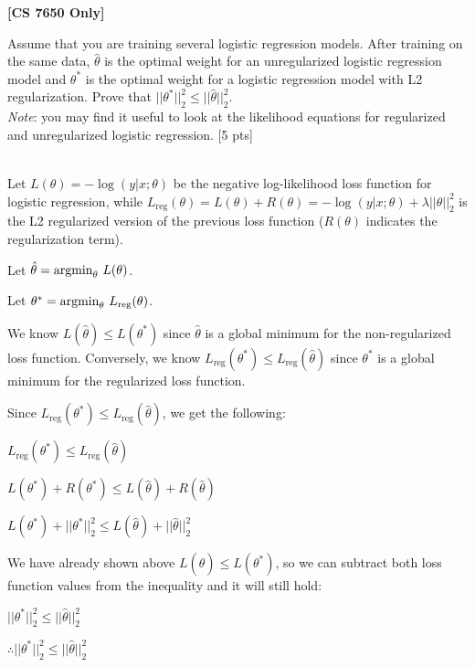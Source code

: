 \textbf{[CS 7650 Only]} 

Assume that you are training several logistic regression models.
After training on the same data, $\hat{\theta}$ is the optimal weight for an unregularized logistic regression model and $\theta^{*}$ is the optimal weight for a logistic regression model with L2 regularization.
Prove that $||\theta^{*}||^{2}_{2} \leq ||\hat{\theta}||^{2}_{2}$. \\
\emph{Note}: you may find it useful to look at the likelihood equations for regularized and unregularized logistic regression.
[5 pts]

\begin{solution} \ \\
	Let $L(\theta) = -\log(y \vert x; \theta)$ be the negative log-likelihood loss function for logistic regression, while $L_{\text{reg}}(\theta) = L(\theta) + R(\theta) = -\log(y \vert x; \theta) + \lambda||\theta||^2_2$ is the L2 regularized version of the previous loss function ($R(\theta)$ indicates the regularization term).
	
	Let $\hat{\theta} = \text{argmin}_\theta \thinspace\thinspace L(\theta)$.
	
	Let $\theta^* = \text{argmin}_{\theta} \thinspace\thinspace L_{\text{reg}}(\theta)$.
	
	We know $L(\hat{\theta}) \leq L(\theta^*)$ since $\hat{\theta}$ is a global minimum for the non-regularized loss function. Conversely, we know $L_{\text{reg}}(\theta^*) \leq L_\text{reg}(\hat{\theta})$ since $\theta^*$ is a global minimum for the regularized loss function.
	
	Since $L_{\text{reg}}(\theta^*) \leq L_\text{reg}(\hat{\theta})$, we get the following:
	
	$L_{\text{reg}}(\theta^*) \leq L_\text{reg}(\hat{\theta})$
	
	$L(\theta^*) + R(\theta^*) \leq L(\hat{\theta}) + R(\hat{\theta})$
	
	$L(\theta^*) + ||\theta^*||^2_2 \leq L(\hat{\theta}) + ||\hat{\theta}||^2_2$
	
	We have already shown above $L(\hat{\theta}) \leq L(\theta^*)$, so we can subtract both loss function values from the inequality and it will still hold:
	
	$||\theta^*||^2_2 \leq ||\hat{\theta}||^2_2$
	
	$\therefore ||\theta^{*}||^{2}_{2} \leq ||\hat{\theta}||^{2}_{2}$\\
\end{solution}